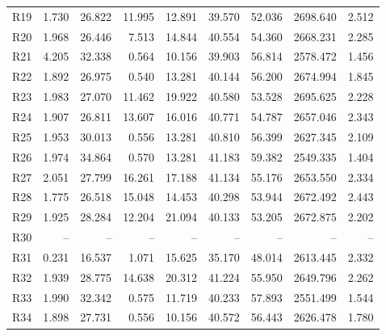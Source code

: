 \begin{longtable}{lrrrrrrrr}
R19 & 1.730 & 26.822 & 11.995 & 12.891 & 39.570 & 52.036 & 2698.640 & 2.512\\
R20 & 1.968 & 26.446 & 7.513 & 14.844 & 40.554 & 54.360 & 2668.231 & 2.285\\
R21 & 4.205 & 32.338 & 0.564 & 10.156 & 39.903 & 56.814 & 2578.472 & 1.456\\
R22 & 1.892 & 26.975 & 0.540 & 13.281 & 40.144 & 56.200 & 2674.994 & 1.845\\
R23 & 1.983 & 27.070 & 11.462 & 19.922 & 40.580 & 53.528 & 2695.625 & 2.228\\
R24 & 1.907 & 26.811 & 13.607 & 16.016 & 40.771 & 54.787 & 2657.046 & 2.343\\
R25 & 1.953 & 30.013 & 0.556 & 13.281 & 40.810 & 56.399 & 2627.345 & 2.109\\
R26 & 1.974 & 34.864 & 0.570 & 13.281 & 41.183 & 59.382 & 2549.335 & 1.404\\
R27 & 2.051 & 27.799 & 16.261 & 17.188 & 41.134 & 55.176 & 2653.550 & 2.334\\
R28 & 1.775 & 26.518 & 15.048 & 14.453 & 40.298 & 53.944 & 2672.492 & 2.443\\
R29 & 1.925 & 28.284 & 12.204 & 21.094 & 40.133 & 53.205 & 2672.875 & 2.202\\
R30 & -- & -- & -- & -- & -- & -- & -- & --\\
R31 & 0.231 & 16.537 & 1.071 & 15.625 & 35.170 & 48.014 & 2613.445 & 2.332\\
R32 & 1.939 & 28.775 & 14.638 & 20.312 & 41.224 & 55.950 & 2649.796 & 2.262\\
R33 & 1.990 & 32.342 & 0.575 & 11.719 & 40.233 & 57.893 & 2551.499 & 1.544\\
R34 & 1.898 & 27.731 & 0.556 & 10.156 & 40.572 & 56.443 & 2626.478 & 1.780\\
\end{longtable}
\clearpage
